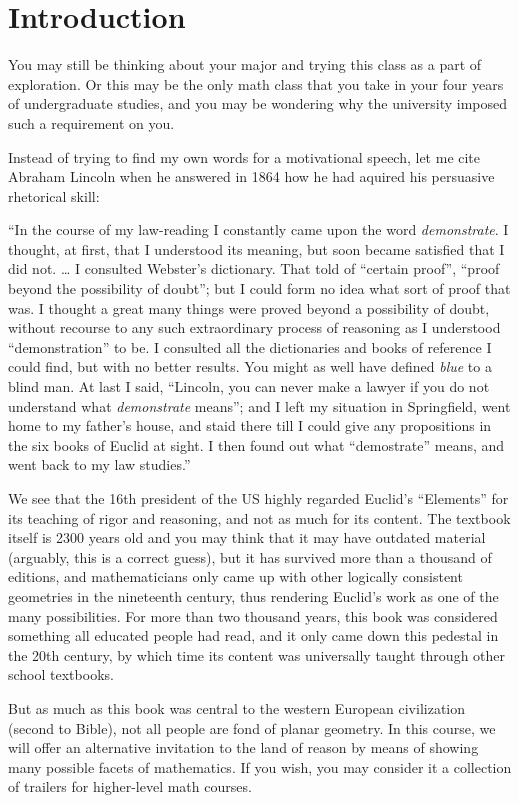 \chapter*{Introduction}

You may still be thinking about your major and trying this class as a part of exploration. Or this may be the only math class that you take in your four years of undergraduate studies, and you may be wondering why the university imposed such a requirement on you. 

Instead of trying to find my own words for a motivational speech, let me cite Abraham Lincoln when he answered in 1864 how he had aquired his persuasive rhetorical skill:

\begin{displayquote}
``In the course of my law-reading I constantly came upon the word
\textit{demonstrate}.
I thought, at first, that I understood its meaning, but soon became satisfied that I did not. \dots
I consulted Webster's dictionary. That told of ``certain proof'', ``proof beyond the possibility of doubt''; but I could form no idea what sort of proof that was. I thought a great many things were proved beyond a possibility of doubt, without recourse to any such extraordinary process of reasoning as I understood ``demonstration'' to be. I consulted all the dictionaries and books of reference I could find, but with no better results. You might as well have defined \textit{blue} to a blind man.
At last I said, ``Lincoln, you can never make a lawyer if you do not understand what \textit{demonstrate} means''; and I left my situation in Springfield, went home to my father's house, and staid there till I could give any propositions in the six books of Euclid at sight. I then found out what ``demostrate'' means, and went back to my law studies.''
\end{displayquote}

We see that the 16th president of the US highly regarded Euclid's ``Elements'' for its teaching of rigor and reasoning, and not as much for its content. The textbook itself is 2300 years old and you may think that it may have outdated material (arguably, this is a correct guess), but it has survived more than a thousand of editions, and mathematicians only came up with other logically consistent geometries in the nineteenth century, thus rendering Euclid's work as one of the many possibilities. For more than two thousand years, this book was considered something all educated people had read, and it only came down this pedestal in the 20th century, by which time its content was universally taught through other school textbooks.

But as much as this book was central to the western European civilization (second to Bible), not all people are fond of planar geometry. In this course, we will offer an alternative invitation to the land of reason by means of showing many possible facets of mathematics. If you wish, you may consider it a collection of trailers for higher-level math courses.